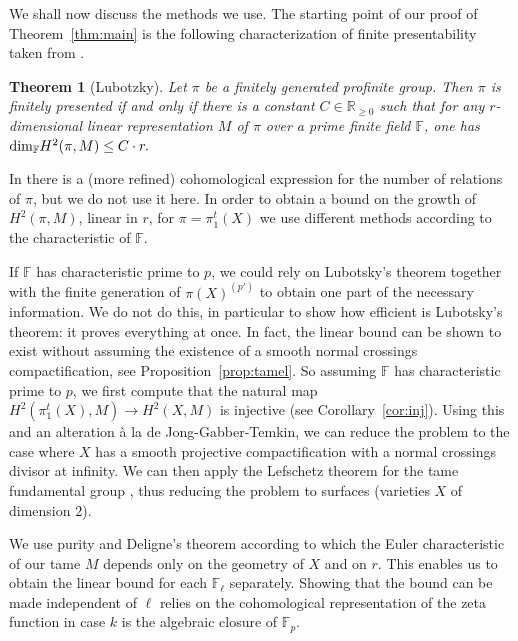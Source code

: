 \documentclass[12pt]{amsart}
\theoremstyle{plain}
\newtheorem{thm}{Theorem}
\theoremstyle{definition}
\numberwithin{thm}{section}
\newcommand{\F}{{\mathbb F}}
\newcommand{\R}{{\mathbb R}}
\numberwithin{equation}{section}
\begin{document}
 \medskip 
 
 
We shall now discuss the methods we use. 
The starting point of our proof of Theorem~\ref{thm:main} is the following characterization of finite presentability taken from \cite[Theorem 0.3]{Lub01}.

\begin{thm}[Lubotzky] \label{thm:lub}
Let $\pi$ be a finitely generated profinite group.
Then $\pi$ is finitely presented if and only if there is a constant $C\in \R_{\ge 0}$ such that for any $r$-dimensional linear representation $M$ of $\pi$  over a prime finite field $\F$, one has 
${\rm dim}_{\F} H^2(\pi, M) \leq C \cdot r.$ \notag


\end{thm}
In \cite[Theorem.~0.2]{Lub01} there is a (more refined) cohomological expression for the number of relations of $\pi$, but we do not use it here.
In order to obtain a bound on the growth of $H^2(\pi, M)$, linear in $r$, for $\pi=\pi_1^t(X)$
 we use different methods according to the characteristic of $\F$. 
 
  If $\F$ has characteristic prime to $p$, we could rely on Lubotsky's theorem together with the finite generation of $\pi(X)^{(p')}$ to obtain one part of the necessary information. We do not do this, in particular to show how efficient is Lubotsky's theorem: it proves everything at once.  In fact, the linear bound can be shown to exist without assuming the existence of a  smooth normal crossings compactification, see Proposition~\ref{prop:tamel}.
  So assuming $\F$ has characteristic prime to $p$,
  we first compute that the natural map  
$H^2(\pi^t_1(X), M) \to H^2(X, M)$ is injective (see Corollary~\ref{cor:inj}).  Using this and an alteration \`a la de Jong-Gabber-Temkin, we can reduce  the problem to the case where $X$ has a smooth projective compactification with a normal crossings divisor at infinity. 
We can then apply the Lefschetz theorem for the tame fundamental group \cite[Theorem~1.1]{EK16}, thus reducing the problem to surfaces (varieties $X$ of dimension $2$). 

We use purity and Deligne's theorem \cite[Corollaire~2.7]{Ill81} according to which the Euler characteristic of our tame $M$  depends only on the geometry of $X$ and on $r$. This enables us to obtain the linear bound for each $\F_\ell$ separately. 
Showing that the bound can be made independent of $\ell$ relies on the cohomological representation of the zeta function in case $k$ is the algebraic closure of $\F_p$.
\end{document}
